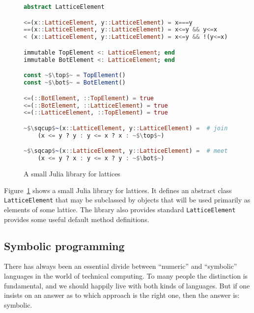 \begin{figure}[!t]
  \begin{center}
\begin{singlespace}
\begin{lstlisting}[language=julia]
abstract LatticeElement

<=(x::LatticeElement, y::LatticeElement) = x===y
==(x::LatticeElement, y::LatticeElement) = x<=y && y<=x
< (x::LatticeElement, y::LatticeElement) = x<=y && !(y<=x)

immutable TopElement <: LatticeElement; end
immutable BotElement <: LatticeElement; end

const ~$\top$~ = TopElement()
const ~$\bot$~ = BotElement()

<=(::BotElement, ::TopElement) = true
<=(::BotElement, ::LatticeElement) = true
<=(::LatticeElement, ::TopElement) = true

~$\sqcup$~(x::LatticeElement, y::LatticeElement) =  # join
    (x <= y ? y : y <= x ? x : ~$\top$~)

~$\sqcap$~(x::LatticeElement, y::LatticeElement) =  # meet
    (x <= y ? x : y <= x ? y : ~$\bot$~)
\end{lstlisting}
\end{singlespace}
  \end{center}
  \label{julialattices}
  \caption{A small Julia library for lattices}
\end{figure}





Figure~\ref{julialattices} shows a small Julia library for lattices.
It defines an abstract class \texttt{LatticeElement} that may be subclassed
by objects that will be used primarily as elements of some lattice.
The library also provides standard
\texttt{LatticeElement} provides some useful default method definitions.



\subsection{Symbolic programming}

There has always been an essential divide between ``numeric'' and ``symbolic''
languages in the world of technical computing. To many people the
distinction is fundamental, and we should happily live with both
kinds of languages. But if one insists on an answer as to which approach
is the right one, then the answer is:   symbolic.

